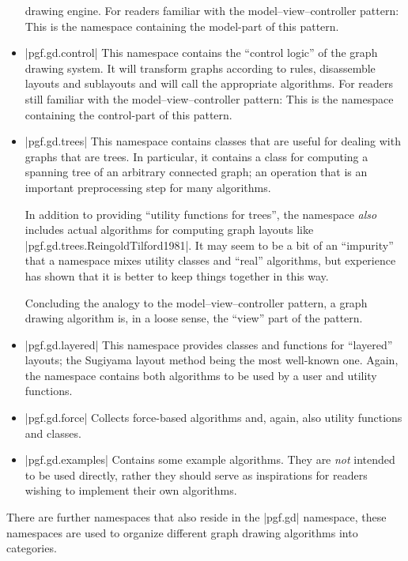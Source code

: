 \begin{itemize}
        drawing engine. For readers familiar with the model--view--controller
        pattern: This is the namespace containing the model-part of this
        pattern.
    \item |pgf.gd.control| This namespace contains the ``control logic'' of the
        graph drawing system. It will transform graphs according to rules,
        disassemble layouts and sublayouts and will call the appropriate
        algorithms. For readers still familiar with the model--view--controller
        pattern: This is the namespace containing the control-part of this
        pattern.
    \item |pgf.gd.trees| This namespace contains classes that are useful for
        dealing with graphs that are trees. In particular, it contains a class
        for computing a spanning tree of an arbitrary connected graph; an
        operation that is an important preprocessing step for many algorithms.

        In addition to providing ``utility functions for trees'', the namespace
        \emph{also} includes actual algorithms for computing graph layouts like
        |pgf.gd.trees.ReingoldTilford1981|. It may seem to be a bit of an
        ``impurity'' that a namespace mixes utility classes and ``real''
        algorithms, but experience has shown that it is better to keep things
        together in this way.

        Concluding the analogy to the model--view--controller pattern, a graph
        drawing algorithm is, in a loose sense, the ``view'' part of the
        pattern.
    \item |pgf.gd.layered| This namespace provides classes and functions for
        ``layered'' layouts; the Sugiyama layout method being the most
        well-known one. Again, the namespace contains both algorithms to be
        used by a user and utility functions.
    \item |pgf.gd.force| Collects force-based algorithms and, again, also
        utility functions and classes.
    \item |pgf.gd.examples| Contains some example algorithms. They are
        \emph{not} intended to be used directly, rather they should serve as
        inspirations for readers wishing to implement their own algorithms.
\end{itemize}

There are further namespaces that also reside in the |pgf.gd| namespace, these
namespaces are used to organize different graph drawing algorithms into
categories.


